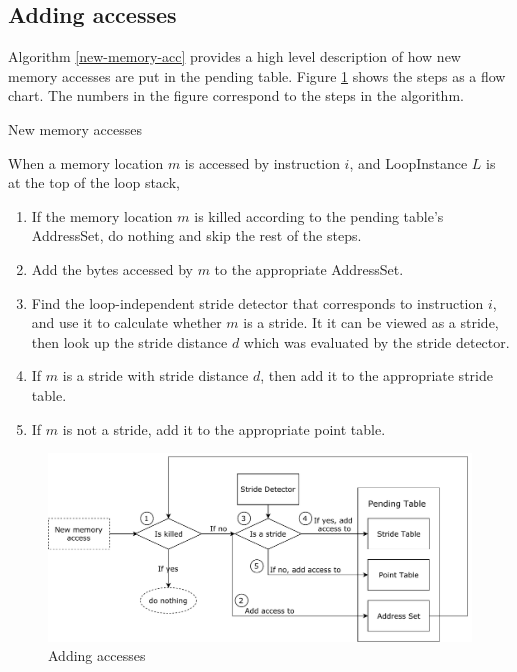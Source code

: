 \documentclass[12pt,twoside]{reedthesis}
\begin{document}
			
		\subsection{Adding accesses}\label{s:add-accesses}
		
		Algorithm \ref{new-memory-acc} provides a high level description of how new memory accesses are put in the pending table. Figure \ref{fig:add-access} shows the steps as a flow chart. The numbers in the figure correspond to the steps in the algorithm.%
		
		\begin{algorithm}
			\caption{New memory accesses}\label{new-memory-acc}
			When a memory location $m$ is accessed by instruction $i$, and LoopInstance $L$ is at the top of the loop stack,
			\begin{enumerate}
				\item If the memory location $m$ is killed according to the pending table's AddressSet, do nothing and skip the rest of the steps. 
				\item Add the bytes accessed by $m$ to the appropriate AddressSet.
				\item Find the loop-independent stride detector that corresponds to instruction $i$, and use it to calculate whether $m$ is a stride. It it can be viewed as a stride, then look up the stride distance $d$ which was evaluated by the stride detector. 
				\item If $m$ is a stride with stride distance $d$, then add it to the appropriate stride table.
				\item If $m$ is not a stride, add it to the appropriate point table. 
			\end{enumerate} 
		\end{algorithm}
	
		
		\begin{figure}
			\caption{Adding accesses}
			\label{fig:add-access}
			\includegraphics[scale=0.7]{add_access.pdf}
		\end{figure}
		
\end{document}
